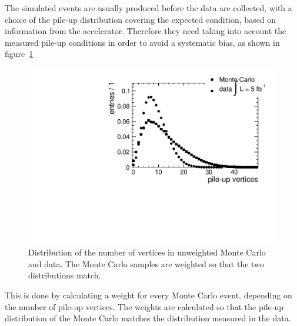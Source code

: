 The simulated events
are usually produced before the data are collected, with a choice of the
pile-up distribution covering the expected condition, based on information
from the accelerator. Therefore they need
taking into account the measured pile-up conditions in order to
avoid a systematic bias, as shown in figure~\ref{fig:pile_up}

\begin{figure}[htb]
    \centering
    \includegraphics[width=.7\textwidth]{images/pdf/pile_up}

    \caption{Distribution of the number of vertices in unweighted Monte Carlo and data. The
    Monte Carlo samples are weighted so that the two distributions match.}
    \label{fig:pile_up}
\end{figure}

This is done by calculating a weight for every Monte Carlo event, depending
on the number of pile-up vertices.
The weights are calculated so that the pile-up distribution of the Monte
Carlo matches the distribution measured in the data.
